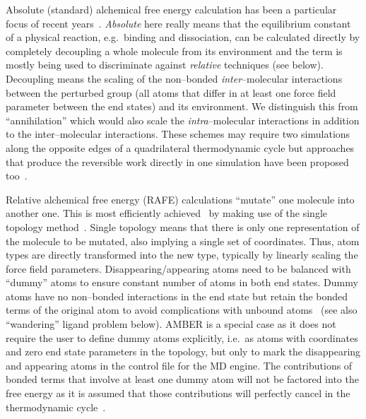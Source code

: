\documentclass[journal=jctcce,manuscript=article]{achemso}
\begin{document}
Absolute (standard) alchemical free energy calculation has been a
particular focus of recent years~\cite{GILSON19971047,
  doi:10.1021/jp0217839, deng_computations_2009,
  ytreberg_comparison_2006, doi:10.1021/ct500964e}.  \emph{Absolute}
here really means that the equilibrium constant of a physical
reaction, e.g.\ binding and dissociation, can be calculated directly
by completely decoupling a whole molecule from its environment and the
term is mostly being used to discriminate against \emph{relative}
techniques (see below).  Decoupling means the scaling of the non--bonded 
\emph{inter}--molecular interactions between the perturbed group (all atoms 
that differ in at least one force field parameter between the end states) and 
its environment.  We distinguish this from ``annihilation'' which would also
scale the \emph{intra}--molecular interactions in addition to the 
inter--molecular interactions. These schemes may require two 
simulations along the opposite edges of a quadrilateral thermodynamic cycle 
but approaches that produce the reversible work directly in one simulation
have been proposed too~\cite{doi:10.1063/1.3519057, C3FD00125C}.

Relative alchemical free energy (RAFE) calculations ``mutate'' one
molecule into another one.  This is most efficiently
achieved~\cite{doi:10.1021/j100056a020, Michel2010} by making use of
the single topology method~\cite{doi:10.1063/1.449208,
doi:10.1021/j100056a020, doi:10.1021/jp981628n}.  Single topology means that 
there is only one representation of the molecule to be mutated, also implying a 
single set of coordinates.
Thus, atom types are directly transformed into the new type,
typically by linearly scaling the force field parameters.
Disappearing/appearing atoms need to be balanced with ``dummy'' atoms to ensure 
constant number of atoms in both end states.  Dummy atoms have no non--bonded 
interactions in the end state but retain the bonded terms of the original atom 
to avoid complications with unbound atoms~\cite{doi:10.1021/jp981628n} (see 
also ``wandering'' ligand problem below).  AMBER is a special case
as it does not require the user to define dummy atoms explicitly, i.e.\ as 
atoms with coordinates and zero end state parameters in the topology, but only 
to mark the disappearing and appearing atoms in the control file for the 
MD engine.  The contributions of bonded terms that involve at least one 
dummy atom will not be factored into the free energy as it is assumed that 
those contributions will perfectly cancel in the thermodynamic 
cycle~\cite{doi:10.1021/acs.jcim.5b00057, doi:10.1021/jp994193s}.
\end{document}
